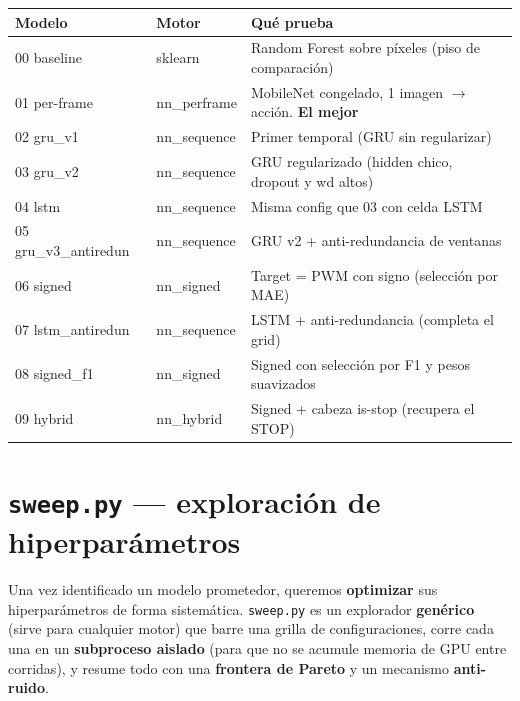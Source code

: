 \documentclass[11pt,a4paper]{article}
\newcommand{\code}[1]{\lstinline[basicstyle=\ttfamily\normalsize]|#1|}
\begin{document}
\begin{center}\small
\begin{tabular}{@{}llp{6.2cm}@{}}
\toprule
\textbf{Modelo} & \textbf{Motor} & \textbf{Qué prueba} \\
\midrule
00 baseline & sklearn & Random Forest sobre píxeles (piso de comparación) \\
01 per-frame & nn\_perframe & MobileNet congelado, 1 imagen $\rightarrow$ acción. \textbf{El mejor} \\
02 gru\_v1 & nn\_sequence & Primer temporal (GRU sin regularizar) \\
03 gru\_v2 & nn\_sequence & GRU regularizado (hidden chico, dropout y wd altos) \\
04 lstm & nn\_sequence & Misma config que 03 con celda LSTM \\
05 gru\_v3\_antiredun & nn\_sequence & GRU v2 + anti-redundancia de ventanas \\
06 signed & nn\_signed & Target = PWM con signo (selección por MAE) \\
07 lstm\_antiredun & nn\_sequence & LSTM + anti-redundancia (completa el grid) \\
08 signed\_f1 & nn\_signed & Signed con selección por F1 y pesos suavizados \\
09 hybrid & nn\_hybrid & Signed + cabeza is-stop (recupera el STOP) \\
\bottomrule
\end{tabular}
\end{center}

\section{\texttt{sweep.py} --- exploración de hiperparámetros}
Una vez identificado un modelo prometedor, queremos \textbf{optimizar} sus hiperparámetros de forma sistemática.
\code{sweep.py} es un explorador \textbf{genérico} (sirve para cualquier motor) que barre una grilla de
configuraciones, corre cada una en un \textbf{subproceso aislado} (para que no se acumule memoria de GPU entre
corridas), y resume todo con una \textbf{frontera de Pareto} y un mecanismo \textbf{anti-ruido}.


\end{document}
